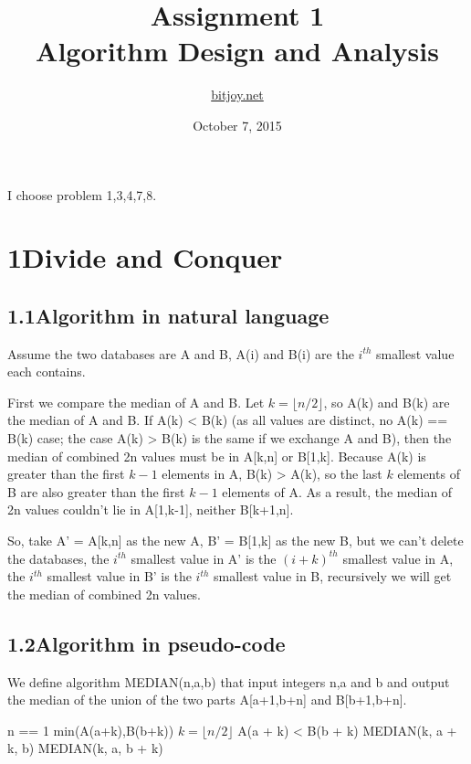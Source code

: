 \documentclass[a4paper,12pt]{article}
\title{Assignment 1\\Algorithm Design and Analysis}
\author{\href{http://bitjoy.net}{bitjoy.net}}
\date{October 7, 2015}
\begin{document}
\maketitle

I choose problem 1,3,4,7,8.

\section*{1\quad Divide and Conquer}
\subsection*{\textnormal{1.1\quad Algorithm in natural language}}


Assume the two databases are A and B, A(i) and B(i) are the $i^{th}$ smallest value each contains.


First we compare the median of A and B. Let $k=\lfloor n/2 \rfloor$, so A(k) and B(k) are the median of A and B. If A(k) < B(k) (as all values are distinct, no A(k) == B(k) case; the case A(k) > B(k) is the same if we exchange A and B), then the median of combined 2n values must be in A[k,n] or B[1,k]. Because A(k) is greater than the first $k-1$ elements in A, B(k) > A(k), so the last $k$ elements of B are also greater than the first $k-1$ elements of A. As a result, the median of 2n values couldn't lie in A[1,k-1], neither B[k+1,n].


So, take A' = A[k,n] as the new A, B' = B[1,k] as the new B, but we can't delete the databases, the $i^{th}$ smallest value in A' is the $(i + k)^{th}$ smallest value in A, the $i^{th}$ smallest value in B' is the $i^{th}$ smallest value in B, recursively we will get the median of combined 2n values.

\subsection*{\textnormal{1.2\quad Algorithm in pseudo-code}}

We define algorithm MEDIAN(n,a,b) that input integers n,a and b and output the median of the union of the two parts A[a+1,b+n] and B[b+1,b+n].

\begin{codebox}
\li \If n == 1
    \Then
\li \Return min(A(a+k),B(b+k))
 	\End
\li $k = \lfloor n/2 \rfloor$
\li \If A(a + k) < B(b + k)
    \Then
\li \Return MEDIAN(k, a + k, b)
\li \Else
\li \Return MEDIAN(k, a, b + k)
	\End
\end{codebox}
\end{document}
